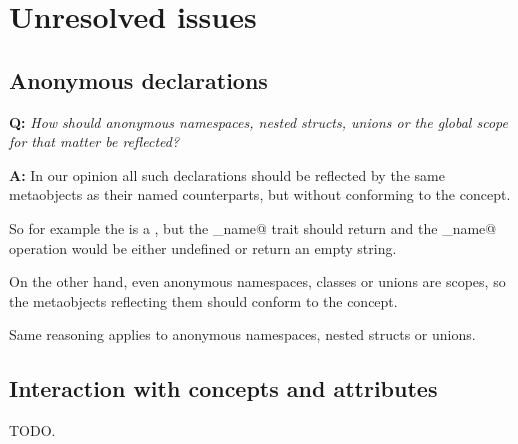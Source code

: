 \section{Unresolved issues}

\subsection{Anonymous declarations}

\textbf{Q:} {\em How should anonymous namespaces, nested structs, unions or
the global scope for that matter be reflected?}

\textbf{A:} In our opinion all such declarations should be reflected by
the same metaobjects as their named counterparts, but without conforming
to the  concept.

So for example the  is a , but
the \verb@has_name@ trait should return \verb@false@ and the \verb@get_name@
operation would be either undefined or return an empty string.

On the other hand, even anonymous namespaces, classes or unions are scopes,
so the metaobjects reflecting them should conform to the  concept.

Same reasoning applies to anonymous namespaces, nested structs or unions.

\subsection{Interaction with concepts and attributes}

TODO.

